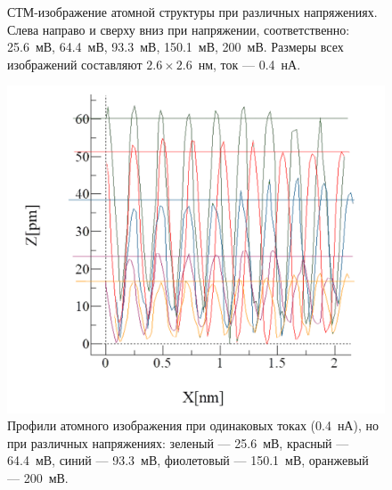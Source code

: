 \documentclass[a4paper, 12pt]{article}
\begin{document}
\begin{figure}[H]
		\caption{СТМ-изображение атомной структуры при различных напряжениях. Слева направо и сверху вниз при напряжении, соответственно: 25.6~мВ, 64.4~мВ, 93.3~мВ, 150.1~мВ, 200~мВ. Размеры всех изображений составляют $2.6\times2.6$~нм, ток --- 0.4~нА.}
		\label{fig:2_different_volt}
	\end{figure}

	\begin{figure}[H]
		\centering
		\includegraphics[width=0.9\linewidth]{../STM_data/STM Profiles new/Graphs/All graphs}
		\caption{Профили атомного изображения при одинаковых токах (0.4~нА), но при различных напряжениях: зеленый --- 25.6~мВ, красный --- 64.4~мВ, синий --- 93.3~мВ, фиолетовый --- 150.1~мВ, оранжевый --- 200~мВ.}
		\label{fig:2_different_volt_profiles}
	\end{figure}
	
\end{document}
